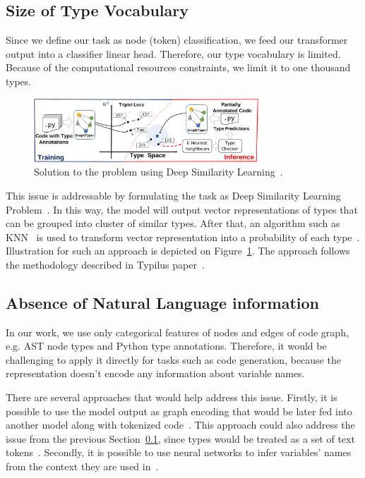 \subsection{Size of Type Vocabulary}\label{subsec:size-of-type-vocabulary}

Since we define our task as node (token) classification, we feed our transformer output into a classifier linear head.
Therefore, our type vocabulary is limited.
Because of the computational resources constraints, we limit it to one thousand types.

\begin{figure}[t]
    \centering
    \includegraphics[width=0.75\textwidth]{figures/dsl.pdf}
    \caption{Solution to the problem using Deep Similarity Learning~\parencite{allamanis2020typilus}.}
    \label{fig:dsl}
\end{figure}

This issue is addressable by formulating the task as Deep Similarity Learning Problem~\cite{chopra2005learning,liao2018tripletbased}.
In this way, the model will output vector representations of types that can be grouped into cluster of similar types.
After that, an algorithm such as KNN~\cite{knn} is used to transform vector representation into a probability of each type~\cite{allamanis2020typilus,mir_type4py_2021}.
Illustration for such an approach is depicted on Figure~\ref{fig:dsl}.
The approach follows the methodology described in Typilus paper~\cite{allamanis2020typilus}.

\subsection{Absence of Natural Language information}\label{subsec:absence-of-natural-language-information}

In our work, we use only categorical features of nodes and edges of code graph, e.g. AST node types and Python type annotations.
Therefore, it would be challenging to apply it directly for tasks such as code generation,
because the representation doesn't encode any information about variable names.

There are several approaches that would help address this issue.
Firstly, it is possible to use the model output as graph encoding that would be later fed into another model along with tokenized code~\cite{tipirneni_structcoder_2022}.
This approach could also address the issue from the previous Section~\ref{subsec:size-of-type-vocabulary}, since types would be treated as a set of text tokens~\cite{peng2023generative}.
Secondly, it is possible to use neural networks to infer variables' names from the context they are used in~\cite{bavishi2018context2name}.
